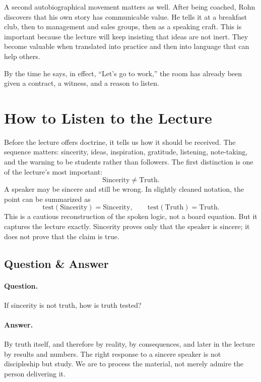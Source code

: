 A second autobiographical movement matters as well. After being coached, Rohn discovers that his own story has communicable value. He tells it at a breakfast club, then to management and sales groups, then as a speaking craft. This is important because the lecture will keep insisting that ideas are not inert. They become valuable when translated into practice and then into language that can help others.

By the time he says, in effect, ``Let's go to work,'' the room has already been given a contract, a witness, and a reason to listen.

\section{How to Listen to the Lecture}

Before the lecture offers doctrine, it tells us how it should be received. The sequence matters: sincerity, ideas, inspiration, gratitude, listening, note-taking, and the warning to be students rather than followers. The first distinction is one of the lecture's most important:
\begin{equation}
\mathrm{Sincerity} \neq \mathrm{Truth}.
\end{equation}
A speaker may be sincere and still be wrong. In slightly cleaned notation, the point can be summarized as
\begin{equation}
\mathrm{test}(\mathrm{Sincerity})=\mathrm{Sincerity},
\qquad
\mathrm{test}(\mathrm{Truth})=\mathrm{Truth}.
\end{equation}
This is a cautious reconstruction of the spoken logic, not a board equation. But it captures the lecture exactly. Sincerity proves only that the speaker is sincere; it does not prove that the claim is true.

\subsection{Question \& Answer}

\paragraph{Question.} If sincerity is not truth, how is truth tested?

\paragraph{Answer.} By truth itself, and therefore by reality, by consequences, and later in the lecture by results and numbers. The right response to a sincere speaker is not discipleship but study. We are to process the material, not merely admire the person delivering it.

